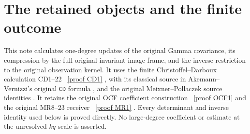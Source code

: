 \section{The retained objects and the finite outcome}

This note calculates one-degree updates of the original Gamma covariance,
its compression by the full original invariant-image frame, and the
inverse restriction to the original observation kernel. It uses the
finite Christoffel--Darboux calculation CD1--22 \cite{dsroot:CD}%
~\href{https://github.com/KokunoYumeto/zeta-function-research-reader/blob/main/workbenches/splitzero-tandem/continuations/20260921-kernel-degree-steps/COMPLETE_CD_BOUNDARY.tex\#L42}{[proof CD1]}%
{}, with its
classical source in Akemann--Vernizzi's original \texttt{CD} formula
\cite{dsroot:AV}, and the original Meixner--Pollaczek source identities
\cite{dsroot:DLMF}. It retains the original OCF coefficient construction
\cite{dsroot:OCF}%
~\href{https://github.com/KokunoYumeto/zeta-function-research-reader/blob/5992ad50c0f2a06921f1fcaded7b4e38097c0739/workbenches/splitzero-tandem/continuations/20260920-original-kernel-mixed-determinants/providers/ORIGINAL_CONDUCTOR_STRIP_FRAME.tex\#L27}{[proof OCF1]}%
{} and the original MR8--23 receiver \cite{dsroot:MR}%
~\href{https://github.com/KokunoYumeto/zeta-function-research-reader/blob/5992ad50c0f2a06921f1fcaded7b4e38097c0739/workbenches/splitzero-tandem/continuations/20260920-original-kernel-mixed-determinants/ORIGINAL_KERNEL_MIXED_DETERMINANT.tex\#L36}{[proof MR1]}%
{}.
Every determinant and inverse identity used below is proved directly.
No large-degree coefficient or estimate at the unresolved \(kq\) scale
is asserted.

